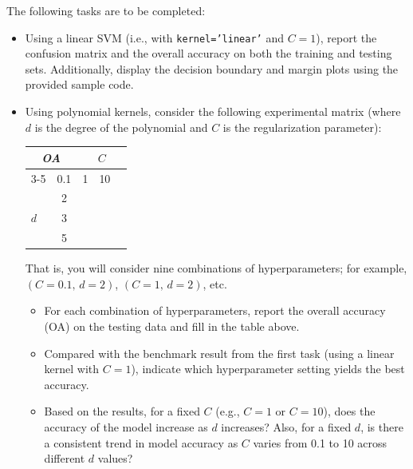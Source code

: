 \documentclass[12pt]{article}
\begin{document}
The following tasks are to be completed:
\begin{itemize}
    \item Using a linear SVM (i.e., with \texttt{kernel='linear'} and $C=1$), report the confusion matrix and the overall accuracy on both the training and testing sets. Additionally, display the decision boundary and margin plots using the provided sample code.
    
    \item Using polynomial kernels, consider the following experimental matrix (where $d$ is the degree of the polynomial and $C$ is the regularization parameter):
    \begin{table}[htb]
    \centering
    \begin{tabular}{|lc|ccc|}
    \hline
    \multicolumn{2}{|c|}{\multirow{2}{*}{\textit{OA}}} & \multicolumn{3}{c|}{$C$}                                 \\ \cline{3-5} 
    \multicolumn{2}{|c|}{}                             & \multicolumn{1}{c|}{0.1} & \multicolumn{1}{c|}{1} & 10 \\ \hline
    \multicolumn{1}{|l|}{\multirow{3}{*}{$d$}} & 2 & \multicolumn{1}{c|}{} & \multicolumn{1}{c|}{} &  \\ \cline{2-5} 
    \multicolumn{1}{|l|}{}             & 3             & \multicolumn{1}{c|}{}    & \multicolumn{1}{c|}{}  &    \\ \cline{2-5} 
    \multicolumn{1}{|l|}{}             & 5             & \multicolumn{1}{c|}{}    & \multicolumn{1}{c|}{}  &    \\ \hline
    \end{tabular}
    \end{table}
    
    That is, you will consider nine combinations of hyperparameters; for example, $(C = 0.1,\, d = 2)$, $(C = 1,\, d = 2)$, etc.
    
    \begin{itemize}
        \item For each combination of hyperparameters, report the overall accuracy (OA) on the testing data and fill in the table above.
        \item Compared with the benchmark result from the first task (using a linear kernel with $C=1$), indicate which hyperparameter setting yields the best accuracy.
        \item Based on the results, for a fixed $C$ (e.g., $C=1$ or $C=10$), does the accuracy of the model increase as $d$ increases? Also, for a fixed $d$, is there a consistent trend in model accuracy as $C$ varies from 0.1 to 10 across different $d$ values?
    \end{itemize}

\end{itemize}
\end{document}
